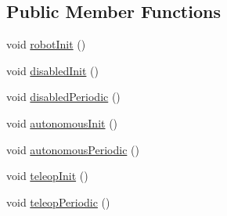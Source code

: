\subsection*{Public Member Functions}
\begin{DoxyCompactItemize}
\item 
void \mbox{\hyperlink{classorg_1_1usfirst_1_1frc3707_1_1_creedence_1_1_robot_a7307806783815b6f22926b44074349c5}{robot\+Init}} ()
\item 
void \mbox{\hyperlink{classorg_1_1usfirst_1_1frc3707_1_1_creedence_1_1_robot_a63535c8f986422f2b29edf079f1f23c7}{disabled\+Init}} ()
\item 
void \mbox{\hyperlink{classorg_1_1usfirst_1_1frc3707_1_1_creedence_1_1_robot_acde68be5df7e5eecda8456a660ff79e2}{disabled\+Periodic}} ()
\item 
void \mbox{\hyperlink{classorg_1_1usfirst_1_1frc3707_1_1_creedence_1_1_robot_ab4d6d5719d69c7f2537ce8502c65eea5}{autonomous\+Init}} ()
\item 
void \mbox{\hyperlink{classorg_1_1usfirst_1_1frc3707_1_1_creedence_1_1_robot_a7b3407b64dbbc64674ed998ceb354c3a}{autonomous\+Periodic}} ()
\item 
void \mbox{\hyperlink{classorg_1_1usfirst_1_1frc3707_1_1_creedence_1_1_robot_ae1b533c6c6269024575e20d8bdd102a9}{teleop\+Init}} ()
\item 
void \mbox{\hyperlink{classorg_1_1usfirst_1_1frc3707_1_1_creedence_1_1_robot_a2f85c1350a8f3b47911d519914d91b21}{teleop\+Periodic}} ()
\end{DoxyCompactItemize}
